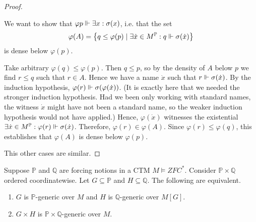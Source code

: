 \documentclass[11pt]{article}
\renewcommand{\P}{\mathbb{P}}
\renewcommand{\phi}{\varphi}
\begin{document}
\begin{proof}
\begin{description}
            We want to show that
            $\phi p \forces \exists x : \sigma(x)$,
            i.e. that the set
            \begin{equation*}
                \phi(A) = \setof{
                    q \leq \phi(p) \sth
                    \exists \dot x \in M^\P :
                    q \forces \sigma(\dot x)
                }
            \end{equation*}
            is dense below $\phi(p)$.

            Take arbitrary $\phi(q) \leq \phi(p)$.
            Then $q \leq p$, so by the density of $A$ below $p$ we find
            $r \leq q$ such that $r \in A$. Hence we have a name $\dot x$ such
            that $r \Vdash \sigma(\dot x)$.
            By the induction hypothesis,
            $\phi(r) \forces \sigma(\phi(\dot x))$.
            (It is exactly here that we needed the stronger induction
            hypothesis.
            Had we been only working with standard names, the witness $\dot x$
            might have not been a standard name, so the weaker induction
            hypothesis would not have applied.)
            Hence, $\phi(\dot x)$ witnesses the existential
            $\exists \dot x \in M^\P : \phi(r) \forces \sigma(\dot x)$.
            Therefore, $\phi(r) \in \phi(A)$.
            Since $\phi(r) \leq \phi(q)$, this establishes that $\phi(A)$ is
            dense below $\phi(p)$.
    \end{description}

    This other cases are similar.
\end{proof}

\renewcommand{\Q}{\mathbb{Q}}

\begin{prop}
    Suppose $\P$ and $\Q$ are forcing notions in a CTM $M \models ZFC^*$.
    Consider $\P \times \Q$ ordered coordinatewise.
    Let $G \subseteq \P$ and $H \subseteq \Q$.
    The following are equivalent.
    \begin{enumerate}
        \item
            $G$ is $\P$-generic over $M$ and $H$ is $\Q$-generic over $M[G]$.

        \item
            $G \times H$ is $\P \times \Q$-generic over $M$.
    \end{enumerate}
\end{prop}
\end{document}
